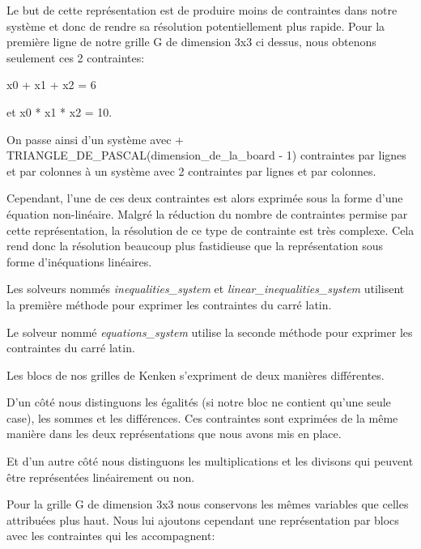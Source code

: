 \documentclass[1]{report}
\begin{document}
\begin{itemize}
        Le but de cette représentation est de produire moins de contraintes dans notre système et donc de rendre sa résolution potentiellement plus rapide. Pour la première ligne de notre grille G de
        dimension 3x3 ci dessus, nous obtenons seulement ces 2 contraintes: \newline
        
        x0 + x1 + x2 = 6 
        
        et x0 * x1 * x2 = 10. \newline

        On passe ainsi d'un système avec  + TRIANGLE\_DE\_PASCAL(dimension\_de\_la\_board - 1) contraintes par lignes et par colonnes à un système avec 2 contraintes par lignes et par colonnes.
        
        Cependant, l'une de ces deux contraintes est alors exprimée sous la forme d'une équation non-linéaire. Malgré la réduction du nombre de contraintes permise par cette représentation, la résolution de ce type de contrainte est très complexe. Cela rend donc la résolution beaucoup plus fastidieuse que la représentation sous forme d'inéquations linéaires. \newline

        Les solveurs nommés \textit{inequalities\_system} et \textit{linear\_inequalities\_system} utilisent la première méthode pour exprimer les contraintes du carré latin.
        
        Le solveur nommé \textit{equations\_system} utilise la seconde méthode pour exprimer les contraintes du carré latin. \newline

        Les blocs de nos grilles de Kenken s'expriment de deux manières différentes.
        
        D'un côté nous distinguons les égalités (si notre bloc ne contient qu'une seule case), les sommes et les différences. Ces contraintes sont exprimées de la même manière dans les deux représentations que nous avons mis en place.
        
        Et d'un autre côté nous distinguons les multiplications et les divisons qui peuvent être représentées linéairement ou non. \newline

        Pour la grille G de dimension 3x3 nous conservons les mêmes variables que celles attribuées plus haut. Nous lui ajoutons cependant une représentation par blocs avec les contraintes qui les accompagnent: \newline


\end{itemize}
\end{document}
